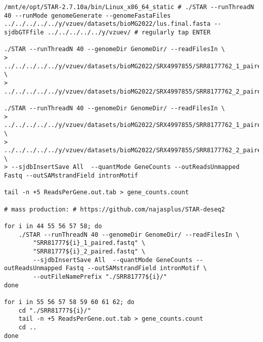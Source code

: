 \begin{verbatim}
/mnt/e/opt/STAR-2.7.10a/bin/Linux_x86_64_static # ./STAR --runThreadN 40 --runMode genomeGenerate --genomeFastaFiles ../../../../../y/vzuev/datasets/bioMG2022/lus.final.fasta --sjdbGTFfile ../../../../../y/vzuev/ # regularly tap ENTER

./STAR --runThreadN 40 --genomeDir GenomeDir/ --readFilesIn \
> ../../../../../y/vzuev/datasets/bioMG2022/SRX4997855/SRR8177762_1_paired.fastq \
> ../../../../../y/vzuev/datasets/bioMG2022/SRX4997855/SRR8177762_2_paired.fastq

./STAR --runThreadN 40 --genomeDir GenomeDir/ --readFilesIn \
> ../../../../../y/vzuev/datasets/bioMG2022/SRX4997855/SRR8177762_1_paired.fastq \
> ../../../../../y/vzuev/datasets/bioMG2022/SRX4997855/SRR8177762_2_paired.fastq \
> --sjdbInsertSave All  --quantMode GeneCounts --outReadsUnmapped Fastq --outSAMstrandField intronMotif

tail -n +5 ReadsPerGene.out.tab > gene_counts.count

# mass production: # https://github.com/najasplus/STAR-deseq2

for i in 44 55 56 57 58; do
    ./STAR --runThreadN 40 --genomeDir GenomeDir/ --readFilesIn \
        "SRR81777${i}_1_paired.fastq" \
        "SRR81777${i}_2_paired.fastq" \
        --sjdbInsertSave All  --quantMode GeneCounts --outReadsUnmapped Fastq --outSAMstrandField intronMotif \
        --outFileNamePrefix "./SRR81777${i}/"
done

for i in 55 56 57 58 59 60 61 62; do
    cd "./SRR81777${i}/"
    tail -n +5 ReadsPerGene.out.tab > gene_counts.count
    cd ..
done

\end{verbatim}

